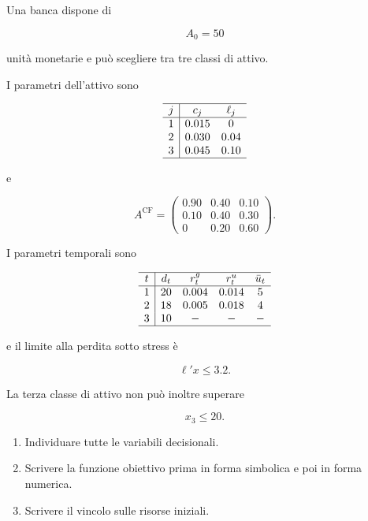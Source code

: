 \begin{exercise}

\label{ex:cap12-proposto-formulazione-completa}

Una banca dispone di

\[
A_0=50
\]

unit\`a monetarie e pu\`o scegliere tra tre classi di attivo.

I parametri dell'attivo sono

\[
\begin{array}{c|cc}
\hline
j & c_j & \ell_j\\
\hline
1 & 0.015 & 0\\
2 & 0.030 & 0.04\\
3 & 0.045 & 0.10\\
\hline
\end{array}
\]

e

\[
A^{\mathrm{CF}}
=
\begin{pmatrix}
0.90 & 0.40 & 0.10\\
0.10 & 0.40 & 0.30\\
0    & 0.20 & 0.60
\end{pmatrix}.
\]

I parametri temporali sono

\[
\begin{array}{c|cccc}
\hline
t & d_t & r^g_t & r^u_t & \bar u_t\\
\hline
1 & 20 & 0.004 & 0.014 & 5\\
2 & 18 & 0.005 & 0.018 & 4\\
3 & 10 & -     & -     & -\\
\hline
\end{array}
\]

e il limite alla perdita sotto stress \`e

\[
\ell'x\leq3.2.
\]

La terza classe di attivo non pu\`o inoltre superare

\[
x_3\leq20.
\]

\begin{enumerate}

\item Individuare tutte le variabili decisionali.

\item Scrivere la funzione obiettivo prima in forma simbolica e poi in forma
numerica.

\item Scrivere il vincolo sulle risorse iniziali.


\end{enumerate}
\end{exercise}
